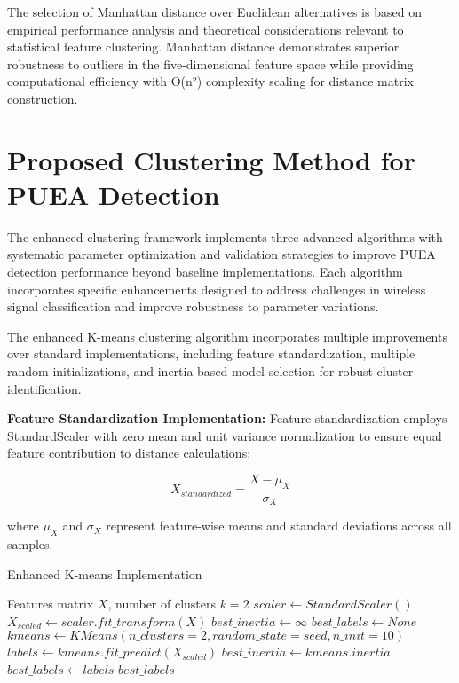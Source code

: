 The selection of Manhattan distance over Euclidean alternatives is based on empirical performance analysis and theoretical considerations relevant to statistical feature clustering. Manhattan distance demonstrates superior robustness to outliers in the five-dimensional feature space while providing computational efficiency with O(n²) complexity scaling for distance matrix construction.

\section{Proposed Clustering Method for PUEA Detection}

The enhanced clustering framework implements three advanced algorithms with systematic parameter optimization and validation strategies to improve PUEA detection performance beyond baseline implementations. Each algorithm incorporates specific enhancements designed to address challenges in wireless signal classification and improve robustness to parameter variations.

The enhanced K-means clustering algorithm incorporates multiple improvements over standard implementations, including feature standardization, multiple random initializations, and inertia-based model selection for robust cluster identification.

\textbf{Feature Standardization Implementation:}
Feature standardization employs StandardScaler with zero mean and unit variance normalization to ensure equal feature contribution to distance calculations:

\begin{equation}
X_{standardized} = \frac{X - \mu_X}{\sigma_X}
\end{equation}

where $\mu_X$ and $\sigma_X$ represent feature-wise means and standard deviations across all samples.

\begin{algorithm}
\caption{Enhanced K-means Implementation}
\begin{algorithmic}[1]
\REQUIRE Features matrix $X$, number of clusters $k=2$
\STATE $scaler \leftarrow StandardScaler()$
\STATE $X_{scaled} \leftarrow scaler.fit\_transform(X)$
\STATE $best\_inertia \leftarrow \infty$
\STATE $best\_labels \leftarrow None$
    \STATE $kmeans \leftarrow KMeans(n\_clusters=2, random\_state=seed, n\_init=10)$
    \STATE $labels \leftarrow kmeans.fit\_predict(X_{scaled})$
        \STATE $best\_inertia \leftarrow kmeans.inertia$
        \STATE $best\_labels \leftarrow labels$
    \ENDIF
\ENDFOR
\RETURN $best\_labels$
\end{algorithmic}
\end{algorithm}


